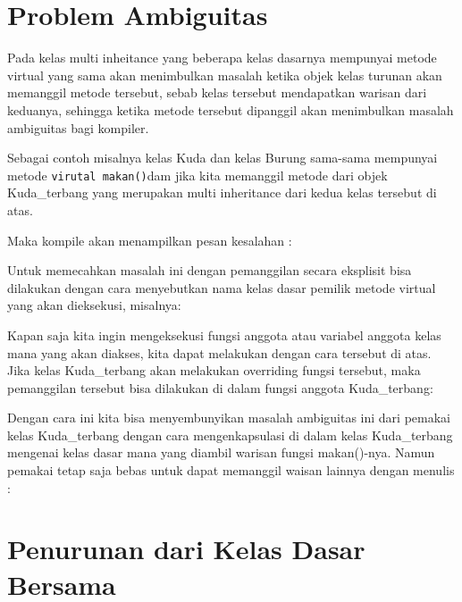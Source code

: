 \section{Problem Ambiguitas}\label{problem-ambiguitas}

Pada kelas multi inheitance yang beberapa kelas dasarnya mempunyai
metode virtual yang sama akan menimbulkan masalah ketika objek kelas
turunan akan memanggil metode tersebut, sebab kelas tersebut mendapatkan
warisan dari keduanya, sehingga ketika metode tersebut dipanggil akan
menimbulkan masalah ambiguitas bagi kompiler.

Sebagai contoh misalnya kelas Kuda dan kelas Burung sama-sama mempunyai
metode \texttt{virutal\ makan()}dam jika kita memanggil metode dari
objek Kuda\_terbang yang merupakan multi inheritance dari kedua kelas
tersebut di atas.



Maka kompile akan menampilkan pesan kesalahan :



Untuk memecahkan masalah ini dengan pemanggilan secara eksplisit bisa
dilakukan dengan cara menyebutkan nama kelas dasar pemilik metode
virtual yang akan dieksekusi, misalnya:



Kapan saja kita ingin mengeksekusi fungsi anggota atau variabel anggota
kelas mana yang akan diakses, kita dapat melakukan dengan cara tersebut
di atas. Jika kelas Kuda\_terbang akan melakukan overriding fungsi
tersebut, maka pemanggilan tersebut bisa dilakukan di dalam fungsi
anggota Kuda\_terbang:



Dengan cara ini kita bisa menyembunyikan masalah ambiguitas ini dari
pemakai kelas Kuda\_terbang dengan cara mengenkapsulasi di dalam kelas
Kuda\_terbang mengenai kelas dasar mana yang diambil warisan fungsi
makan()-nya. Namun pemakai tetap saja bebas untuk dapat memanggil waisan
lainnya dengan menulis :



\section{Penurunan dari Kelas Dasar
Bersama}\label{penurunan-dari-kelas-dasar-bersama}

